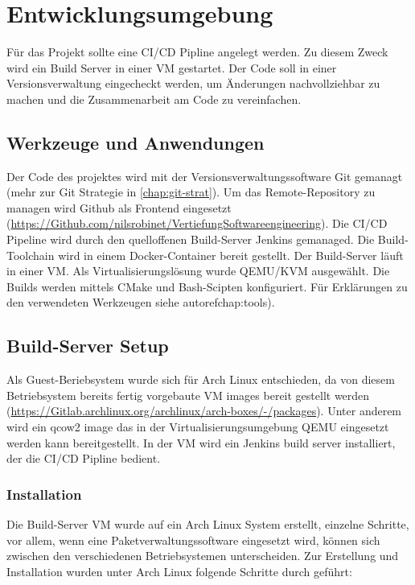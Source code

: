 \chapter{Entwicklungsumgebung}

Für das Projekt sollte eine \acf{CI/CD} Pipline angelegt werden. Zu diesem Zweck wird ein Build Server in einer \acf{VM} gestartet. Der Code soll in einer Versionsverwaltung eingecheckt werden, um Änderungen nachvollziehbar zu machen und die Zusammenarbeit am Code zu vereinfachen.

\section{Werkzeuge und Anwendungen}

Der Code des projektes wird mit der Versionsverwaltungssoftware Git gemanagt (mehr zur Git Strategie in \autoref{chap:git-strat}). Um das Remote-Repository zu managen wird Github als Frontend eingesetzt (\url{https://Github.com/nilsrobinet/VertiefungSoftwareengineering}). Die \ac{CI/CD} Pipeline wird durch den quelloffenen Build-Server Jenkins gemanaged. Die Build-Toolchain wird in einem Docker-Container bereit gestellt. Der Build-Server läuft in einer \ac{VM}. Als Virtualisierungslösung wurde QEMU/KVM ausgewählt. Die Builds werden mittels CMake und Bash-Scipten konfiguriert. Für Erklärungen zu den verwendeten Werkzeugen siehe autoref{chap:tools}).

\section{Build-Server Setup}

Als Guest-Beriebsystem wurde sich für Arch Linux entschieden, da von diesem Betriebsystem bereits fertig vorgebaute \ac{VM} images bereit gestellt werden (\url{https://Gitlab.archlinux.org/archlinux/arch-boxes/-/packages}). Unter anderem wird ein qcow2 image das in der Virtualisierungsumgebung QEMU eingesetzt werden kann bereitgestellt.
In der \ac{VM} wird ein Jenkins build server installiert, der die \ac{CI/CD} Pipline bedient.

\subsection{Installation}

Die Build-Server \ac{VM} wurde auf ein Arch Linux System erstellt, einzelne Schritte, vor allem, wenn eine Paketverwaltungssoftware eingesetzt wird, können sich zwischen den verschiedenen Betriebsystemen unterscheiden.
Zur Erstellung und Installation wurden unter Arch Linux folgende Schritte durch geführt:

